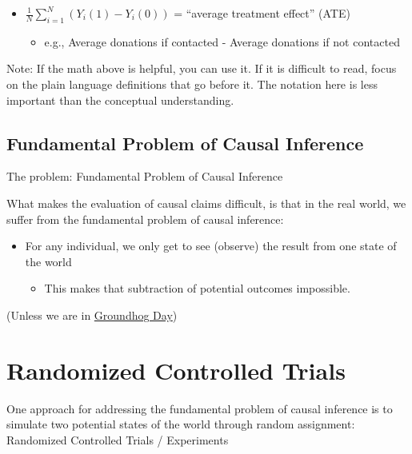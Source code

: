 \documentclass[
  letterpaper,
  DIV=11,
  numbers=noendperiod]{scrreprt}
\providecommand{\tightlist}{%
  \setlength{\itemsep}{0pt}\setlength{\parskip}{0pt}}\usepackage{longtable,booktabs,array}
\begin{document}
\begin{itemize}
\tightlist
\item
  \(\frac{1}{N} \sum_{i=1}^N (Y_i (1)-Y_i (0))\) = ``average treatment
  effect'' (ATE)

  \begin{itemize}
  \tightlist
  \item
    e.g., Average donations if contacted - Average donations if not
    contacted
  \end{itemize}
\end{itemize}

Note: If the math above is helpful, you can use it. If it is difficult
to read, focus on the plain language definitions that go before it. The
notation here is less important than the conceptual understanding.

\hypertarget{fundamental-problem-of-causal-inference}{%
\subsection{Fundamental Problem of Causal
Inference}\label{fundamental-problem-of-causal-inference}}

The problem: Fundamental Problem of Causal Inference

What makes the evaluation of causal claims difficult, is that in the
real world, we suffer from the fundamental problem of causal inference:

\begin{itemize}
\tightlist
\item
  For any individual, we only get to see (observe) the result from one
  state of the world

  \begin{itemize}
  \tightlist
  \item
    This makes that subtraction of potential outcomes impossible.
  \end{itemize}
\end{itemize}

(Unless we are in
\href{https://www.youtube.com/watch?v=5E0M6Rh9qpg}{Groundhog Day})

\hypertarget{randomized-controlled-trials}{%
\section{Randomized Controlled
Trials}\label{randomized-controlled-trials}}

One approach for addressing the fundamental problem of causal inference
is to simulate two potential states of the world through random
assignment: Randomized Controlled Trials / Experiments
\end{document}
